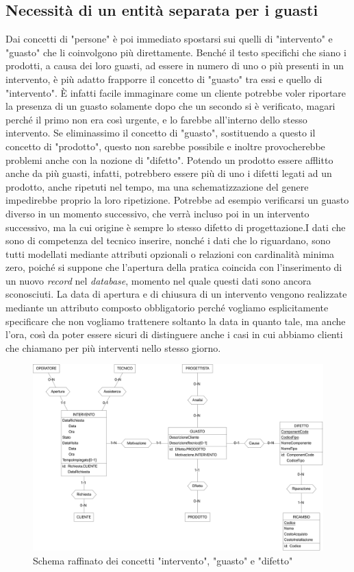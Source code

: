 \documentclass[a4paper, 12pt]{report}
\begin{document}
\subsection{Necessità di un entità separata per i guasti}

Dai concetti di "persone" è poi immediato spostarsi sui quelli di "intervento" e "guasto" che li coinvolgono più direttamente. Benché il testo
specifichi che siano i prodotti, a causa dei loro guasti, ad essere in numero di uno o più presenti in un intervento, è più adatto frapporre il
concetto di "guasto" tra essi e quello di "intervento". È infatti facile immaginare come un cliente potrebbe voler riportare la presenza
di un guasto solamente dopo che un secondo si è verificato, magari perché il primo non era così urgente, e lo farebbe all'interno dello stesso intervento.
Se eliminassimo il concetto di "guasto", sostituendo a questo il concetto di "prodotto", questo non sarebbe possibile e inoltre provocherebbe problemi anche con la nozione di "difetto". Potendo
un prodotto essere afflitto anche da più guasti, infatti, potrebbero essere più di uno i difetti legati ad un prodotto, anche ripetuti nel tempo,
ma una schematizzazione del genere impedirebbe proprio la loro ripetizione. Potrebbe ad esempio verificarsi un guasto diverso in un momento successivo,
che verrà incluso poi in un intervento successivo, ma la cui origine è sempre lo stesso difetto di progettazione.\newline I dati che sono di competenza del tecnico
inserire, nonché i dati che lo riguardano, sono tutti modellati mediante attributi opzionali o relazioni con cardinalità minima zero, poiché si suppone che l'apertura della pratica coincida con 
l'inserimento di un nuovo \textit{record} nel \textit{database}, momento nel quale questi dati sono ancora sconosciuti.
La data di apertura e di chiusura di un intervento vengono realizzate mediante un attributo composto obbligatorio perché vogliamo esplicitamente specificare che non vogliamo
trattenere soltanto la data in quanto tale, ma anche l'ora, così da poter essere sicuri di distinguere anche i casi in cui abbiamo clienti che chiamano per più interventi nello
stesso giorno.

\begin{figure}[H]
	\centering
	\includegraphics[width=\linewidth]{images/interventi.png}
	\caption{Schema raffinato dei concetti "intervento", "guasto" e "difetto"}
\end{figure}
\end{document}
